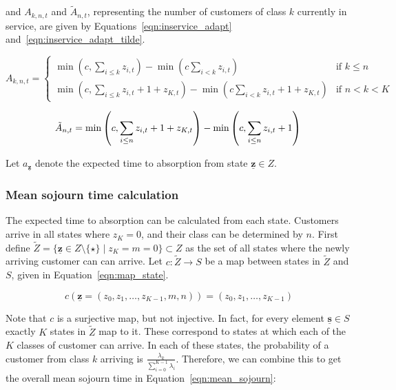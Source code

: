 \documentclass{article}
\begin{document}
and $A_{k,n,t}$ and $\tilde{A}_{n, t}$, representing the number of customers of
class $k$ currently in service, are given by Equations~\ref{eqn:inservice_adapt}
and~\ref{eqn:inservice_adapt_tilde}.

\begin{equation}\label{eqn:inservice_adapt}
A_{k,n,t} =
\begin{cases}
\min\left(c, \sum_{i \leq k} z_{i,t}\right) - \min\left(c \sum_{i < k} z_{i,t}\right) & \text{if } k \leq n \\
\min\left(c, \sum_{i \leq k} z_{i,t} + 1 + z_{K,t}\right) - \min\left(c \sum_{i < k} z_{i,t} + 1 + z_{K,t}\right) & \text{if } n < k < K
\end{cases}
\end{equation}

\begin{equation}\label{eqn:inservice_adapt_tilde}
\tilde{A}_{n,t} =
\min\left(c, \sum_{i \leq n} z_{i,t} + 1 + z_{K,t}\right) - \min\left(c, \sum_{i \leq n} z_{i,t} + 1\right) \\
\end{equation}

Let $a_{\underline{\mathbf{z}}}$ denote the expected time to absorption
from state $\underline{\mathbf{z}} \in Z$.


\subsubsection{Mean sojourn time calculation}\label{sec:meansojourncalc}
The expected time to absorption can be calculated from each state.
Customers arrive in all states where $z_K = 0$, and their class can be
determined by $n$. First define
$\tilde{Z} = \{\underline{\mathbf{z}} \in Z\setminus\{\star\} \; | \; z_K = m = 0\} \subset Z$
as the set of all states where the newly arriving customer can can arrive.
Let $c: \tilde{Z} \rightarrow S$ be a map between states in $\tilde{Z}$ and $S$,
given in Equation~\ref{eqn:map_state}.

\begin{equation}\label{eqn:map_state}
c\left(\underline{\mathbf{z}} = (z_0, z_1, \dots, z_{K-1}, m, n) \right) = (z_0, z_1, \dots, z_{K-1})
\end{equation}

Note that $c$ is a surjective map, but not injective. In fact, for every element
$\underline{\mathbf{s}} \in S$ exactly $K$ states in $\tilde{Z}$ map to it.
These correspond to states at which each of the $K$ classes of customer can
arrive. In each of these states, the probability of a customer from class $k$
arriving is $\frac{\lambda_k}{\sum_{i=0}^{K-1} \lambda_i}$. Therefore, we can
combine this to get the overall mean sojourn time in
Equation~\ref{eqn:mean_sojourn}:
\end{document}
